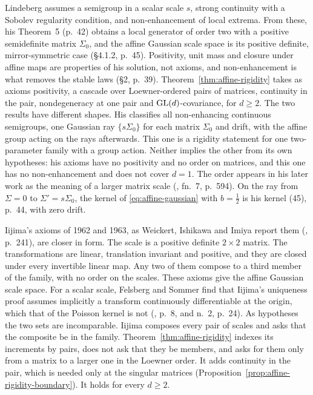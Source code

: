 \begin{remark}\label{rem:lindeberg}
Lindeberg  assumes a semigroup in a scalar scale $s$, strong
continuity with a Sobolev regularity condition, and non-enhancement of local extrema. From these,
his Theorem~5 (p.~42) obtains a local generator of order two with a positive semidefinite matrix
$\Sigma_0$, and the affine Gaussian scale space is its positive definite, mirror-symmetric case
(\S4.1.2, p.~45). Positivity, unit mass and closure under affine maps are properties of his
solution, not axioms, and non-enhancement is what removes the stable laws (\S2, p.~39).
Theorem~\ref{thm:affine-rigidity} takes as axioms positivity, a cascade over Loewner-ordered pairs
of matrices, continuity in the pair, nondegeneracy at one pair and $\mathrm{GL}(d)$-covariance, for $d \ge 2$.
The two results have different shapes. His classifies all non-enhancing continuous semigroups, one
Gaussian ray $\{s\Sigma_0\}$ for each matrix $\Sigma_0$ and drift, with the affine group acting on
the rays afterwards. This one is a rigidity statement for one two-parameter family with a group
action. Neither implies the other from its own hypotheses: his axioms have no positivity and no
order on matrices, and this one has no non-enhancement and does not cover $d = 1$. The order appears
in his later work as the meaning of a larger matrix scale (, fn.~7,
p.~594). On the ray from
$\Sigma = 0$ to $\Sigma' = s\Sigma_0$, the kernel of \ref{eq:affine-gaussian} with $b = \tfrac12$ is
his kernel (45), p.~44, with zero drift.

Iijima's axioms of 1962 and 1963, as Weickert, Ishikawa and Imiya report them
(, p.~241), are closer in form. The scale is a positive definite
$2 \times 2$ matrix. The transformations are linear, translation invariant and positive, and they are
closed under every invertible linear map. Any two of them compose to a third member of the family,
with no order on the scales. These axioms give the affine Gaussian scale space. For a scalar scale,
Felsberg and Sommer find that Iijima's uniqueness proof assumes implicitly a transform continuously
differentiable at the origin, which that of the Poisson kernel is not (,
p.~8, and n.~2, p.~24). As hypotheses the two
sets are incomparable. Iijima composes every pair of scales and asks that the composite be in the
family. Theorem~\ref{thm:affine-rigidity} indexes its increments by pairs, does not ask that they be
members, and asks for them only from a matrix to a larger one in the Loewner order.
It adds continuity in the pair, which is needed only at the singular matrices
(Proposition~\ref{prop:affine-rigidity-boundary}). It holds for every $d \ge 2$.
\end{remark}

